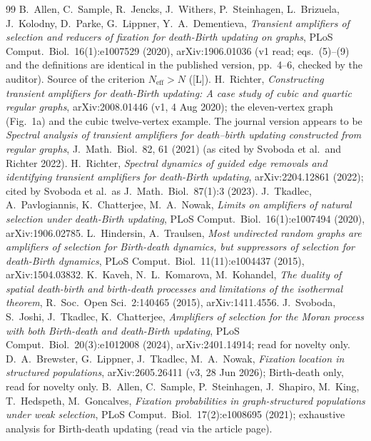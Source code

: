 \documentclass[10pt]{article}
\newcommand{\tier}[1]{\textsf{[#1]}}
\newcommand{\tL}{\tier{L}}
\newcommand{\Neff}{N_{\mathrm{eff}}}
\begin{document}
\begin{thebibliography}{99}\small
{} B.~Allen, C.~Sample, R.~Jencks, J.~Withers, P.~Steinhagen, L.~Brizuela, J.~Kolodny, D.~Parke, G.~Lippner, Y.~A.~Dementieva, \emph{Transient amplifiers of selection and reducers of fixation for death-Birth updating on graphs}, PLoS Comput.\ Biol.\ 16(1):e1007529 (2020), arXiv:1906.01036 (v1 read; eqs.~(5)--(9) and the definitions are identical in the published version, pp.~4--6, checked by the auditor). Source of the criterion $\Neff>N$ (\tL).
 H.~Richter, \emph{Constructing transient amplifiers for death-Birth updating: A case study of cubic and quartic regular graphs}, arXiv:2008.01446 (v1, 4 Aug 2020); the eleven-vertex graph (Fig.~1a) and the cubic twelve-vertex example. The journal version appears to be \emph{Spectral analysis of transient amplifiers for death--birth updating constructed from regular graphs}, J.\ Math.\ Biol.\ 82, 61 (2021) (as cited by Svoboda et al.\ and Richter 2022).
 H.~Richter, \emph{Spectral dynamics of guided edge removals and identifying transient amplifiers for death-Birth updating}, arXiv:2204.12861 (2022); cited by Svoboda et al.\ as J.\ Math.\ Biol.\ 87(1):3 (2023).
 J.~Tkadlec, A.~Pavlogiannis, K.~Chatterjee, M.~A.~Nowak, \emph{Limits on amplifiers of natural selection under death-Birth updating}, PLoS Comput.\ Biol.\ 16(1):e1007494 (2020), arXiv:1906.02785.
 L.~Hindersin, A.~Traulsen, \emph{Most undirected random graphs are amplifiers of selection for Birth-death dynamics, but suppressors of selection for death-Birth dynamics}, PLoS Comput.\ Biol.\ 11(11):e1004437 (2015), arXiv:1504.03832.
 K.~Kaveh, N.~L.~Komarova, M.~Kohandel, \emph{The duality of spatial death-birth and birth-death processes and limitations of the isothermal theorem}, R.\ Soc.\ Open Sci.\ 2:140465 (2015), arXiv:1411.4556.
 J.~Svoboda, S.~Joshi, J.~Tkadlec, K.~Chatterjee, \emph{Amplifiers of selection for the Moran process with both Birth-death and death-Birth updating}, PLoS Comput.\ Biol.\ 20(3):e1012008 (2024), arXiv:2401.14914; read for novelty only.
 D.~A.~Brewster, G.~Lippner, J.~Tkadlec, M.~A.~Nowak, \emph{Fixation location in structured populations}, arXiv:2605.26411 (v3, 28 Jun 2026); Birth-death only, read for novelty only.
 B.~Allen, C.~Sample, P.~Steinhagen, J.~Shapiro, M.~King, T.~Hedspeth, M.~Goncalves, \emph{Fixation probabilities in graph-structured populations under weak selection}, PLoS Comput.\ Biol.\ 17(2):e1008695 (2021); exhaustive analysis for Birth-death updating (read via the article page).

\end{thebibliography}
\end{document}
